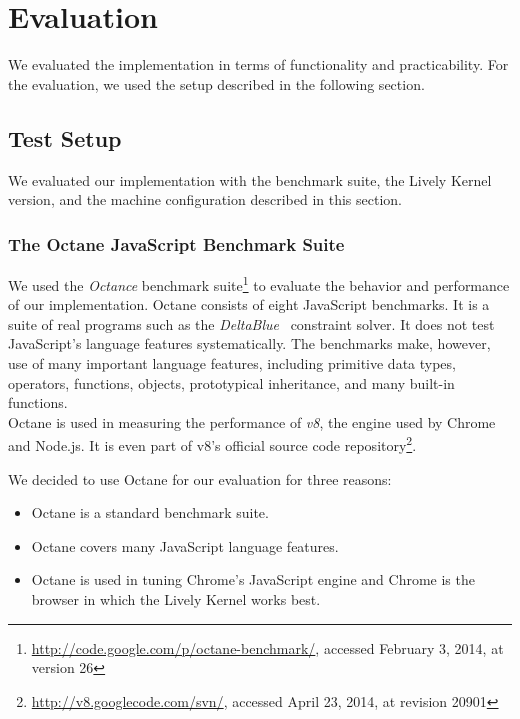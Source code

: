 \chapter{Evaluation} \label{chapter:EVALUATION}

We evaluated the implementation in terms of functionality and practicability.
For the evaluation, we used the setup described in the following section.


\section{Test Setup} \label{sec:EVALUATION:1}

We evaluated our implementation with the benchmark suite, the Lively Kernel version, and the machine configuration described in this section.

\subsection{The Octane JavaScript Benchmark Suite}

We used the \emph{Octance} benchmark suite\footnote{\url{http://code.google.com/p/octane-benchmark/}, accessed February 3, 2014, at version 26} to evaluate the behavior and performance of our implementation.
Octane consists of eight JavaScript benchmarks.
It is a suite of real programs such as the \emph{DeltaBlue}~\cite{FreemanBenson1990ICS} constraint solver.
It does not test JavaScript's language features systematically.
The benchmarks make, however, use of many important language features, including primitive data types, operators, functions, objects, prototypical inheritance, and many built-in functions.\\
Octane is used in measuring the performance of \emph{v8}, the engine used by Chrome and Node.js.
It is even part of v8's official source code repository\footnote{\url{http://v8.googlecode.com/svn/}, accessed April 23, 2014, at revision 20901}.

We decided to use Octane for our evaluation for three reasons:

\begin{itemize}
    \item Octane is a standard benchmark suite.
    \item Octane covers many JavaScript language features.
    \item Octane is used in tuning Chrome's JavaScript engine and Chrome is the browser in which the Lively Kernel works best.
\end{itemize}



